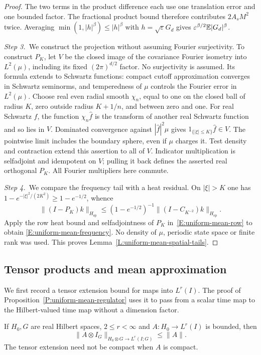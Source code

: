 \begin{proof}
  The two terms in the product difference each use one translation error and
  one bounded factor. The fractional product bound therefore contributes
  $2A_sM^2$ twice. Averaging $\min(1,|h|^\beta)\le |h|^\beta$ with
  $h=\sqrt\varepsilon G_d$ gives $\varepsilon^{\beta/2}\mathbb{E}|G_d|^\beta$.

  \medskip
  \noindent\textit{Step 3.~}We construct the projection without assuming
  Fourier surjectivity.
  To construct $P_K$, let $V$ be the closed image of the covariance Fourier
  isometry into $L^2(\mu)$, including its fixed $(2\pi)^{d/2}$ factor. No
  surjectivity is assumed. Its formula extends to Schwartz functions: compact
  cutoff approximation converges in Schwartz seminorms, and temperedness of
  $\mu$ controls the Fourier error in $L^2(\mu)$. Choose real even radial smooth
  $\chi_n$, equal to one on the closed ball of radius $K$, zero outside radius
  $K+1/n$, and between zero and one. For real Schwartz $f$, the function
  $\chi_n\widehat{f}$ is the transform of another real Schwartz function and so
  lies in $V$. Dominated convergence against $|\widehat{f}|^2\mu$ gives
  $1_{\{|\xi|\le K\}}\widehat{f} \in V$. The pointwise limit includes the
  boundary sphere, even if $\mu$ charges it. Test density and contraction extend
  this assertion to all of $V$. Indicator multiplication is selfadjoint and
  idempotent on $V$; pulling it back defines the asserted real orthogonal $P_K$.
  All Fourier multipliers here commute.


  \medskip
  \noindent\textit{Step 4.~}We compare the frequency tail with a heat
  residual.
  On $|\xi| > K$ one has $1-e^{-|\xi|^2/(2K^2)} \ge 1-e^{-1/2}$, whence
  \[
    \|(I-P_K)k\|_{H_{\mathrm{sp}}}
    \le(1-e^{-1/2})^{-1}\|(I-C_{K^{-2}})k\|_{H_{\mathrm{sp}}}.
  \]
  Apply the row heat bound and selfadjointness of $P_K$
  in~\eqref{E:uniform-mean-row} to obtain \eqref{E:uniform-mean-frequency}. No
  density of $\mu$, periodic state space or finite rank was used. This proves
  Lemma~\ref{L:uniform-mean-spatial-tails}.
\end{proof}

\subsection{Tensor products and mean approximation}

We first record a tensor extension bound for maps into $L^r(I)$. The proof
of Proposition~\ref{P:uniform-mean-regulator} uses it to pass from a scalar
time map to the Hilbert-valued time map without a dimension factor.
%
\begin{lemma}
  \label{L:uniform-mean-tensor}
  If $H_0,G$ are real Hilbert spaces, $2 \le r < \infty$ and $A:H_0 \to L^r(I)$
  is bounded, then
  \[
    \|A\otimes I_G\|_{H_0\otimes G\to L^r(I;G)}\le\|A\|.
  \]
  The tensor extension need not be compact when $A$ is compact.
\end{lemma}

